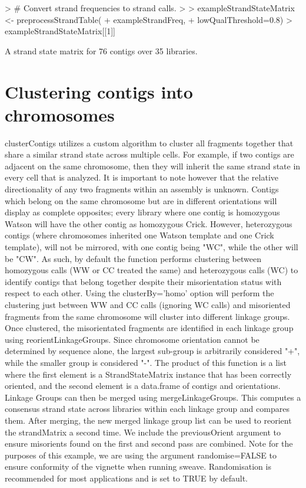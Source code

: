 \documentclass{article}
\begin{document}
\begin{Schunk}
\begin{Sinput}
> # Convert strand frequencies to strand calls.
> 
> exampleStrandStateMatrix <- preprocessStrandTable(
+ exampleStrandFreq, 
+ lowQualThreshold=0.8)
> exampleStrandStateMatrix[[1]]
\end{Sinput}
\begin{Soutput}
A strand state matrix for  76  contigs over  35  libraries.
\end{Soutput}
\end{Schunk}

\section{Clustering contigs into chromosomes}

clusterContigs utilizes a custom algorithm to cluster all fragments together that share a similar strand state across multiple cells.  For example, if two contigs are adjacent on the same chromosome, then they will inherit the same strand state in every cell that is analyzed.  It is important to note however that the relative directionality of any two fragments within an assembly is unknown. Contigs which belong on the same chromosome but are in different orientations will display as complete opposites; every library where one contig is homozygous Watson will have the other contig as homozygous Crick.  However, heterozygous contigs (where chromosomes inherited one Watson template and one Crick template), will not be mirrored, with one contig being "WC", while the other will be "CW". As such, by default the function performs clustering between homozygous calls (WW or CC treated the same) and heterozygous calls (WC) to identify contigs that belong together despite their misorientation status with respect to each other. Using the clusterBy='homo' option will perform the clustering just between WW and CC calls (ignoring WC calls) and misoriented fragments from the same chromosome will cluster into different linkage groups. Once clustered, the misorientated fragments are identified in each linkage group using reorientLinkageGroups. Since chromosome orientation cannot be determined by sequence alone, the largest sub-group is arbitrarily considered "+", while the smaller group is considered "-". The product of this function is a list where the first element is a StrandStateMatrix instance that has been correctly oriented, and the second element is a data.frame of contigs and orientations. Linkage Groups can then be merged using mergeLinkageGroups. This computes a consensus strand state across libraries within each linkage group and compares them.  After merging, the new merged linkage group list can be used to reorient the strandMatrix a second time. We include the previousOrient argument to ensure misorients found on the first and second pass are combined. Note for the purposes of this example, we are using the argument randomise=FALSE to ensure conformity of the vignette when running sweave. Randomisation is recommended for most applications and is set to TRUE by default.
\end{document}

